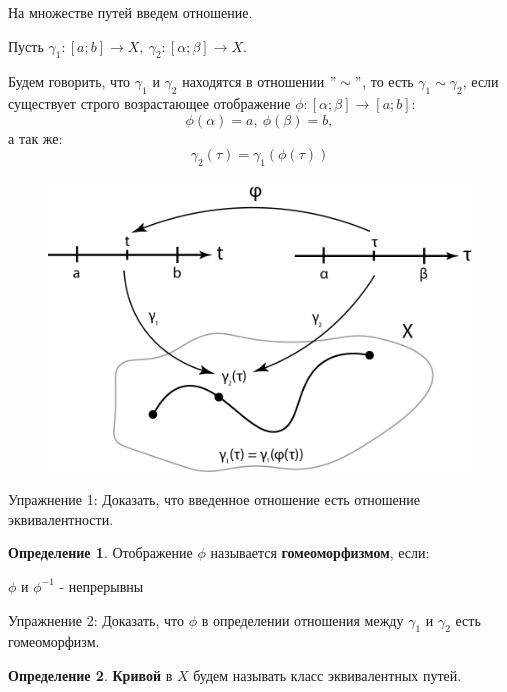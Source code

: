 \documentclass{report}
\theoremstyle{definition}
\newtheorem{definition}{Определение}[section]
\begin{document}
\clearpage

На множестве путей введем отношение.

Пусть $\gamma_1:[a;b]\rightarrow X, \ \gamma_2:[\alpha;\beta] \rightarrow X$.

Будем говорить, что $\gamma_1$ и $\gamma_2$ находятся в отношении $"\sim"$, то есть $\gamma_1 \sim \gamma_2$,
если существует строго возрастающее отображение $\phi:[\alpha;\beta]\rightarrow[a;b]:$
\begin{equation*}
  \phi(\alpha) = a, \ \phi(\beta) = b,
\end{equation*}
а так же:
\begin{equation*}
  \gamma_2(\tau) = \gamma_1(\phi(\tau))
\end{equation*}
\begin{figure}[H]
  \begin{center}
    \includegraphics[scale=0.2]{graph7.png}\label{figure7}
  \end{center}
\end{figure}

Упражнение 1: Доказать, что введенное отношение есть отношение эквивалентности.

\begin{definition}
  Отображение $\phi$ называется \textbf{гомеоморфизмом}, если:
  \begin{center}
    $\phi$ и $\phi^{-1}$ - непрерывны
  \end{center}
\end{definition}

Упражнение 2: Доказать, что $\phi$ в определении отношения между $\gamma_1$ и $\gamma_2$ есть
гомеоморфизм.

\begin{definition}
  \textbf{Кривой} в $X$ будем называть класс эквивалентных путей.
\end{definition}
\end{document}
